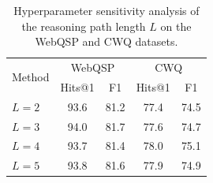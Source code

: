 \begin{table}[t]
\centering
\small
\begin{tabular}{lcccc}
\toprule
\multirow{2}{*}{Method} & \multicolumn{2}{c}{WebQSP} & \multicolumn{2}{c}{CWQ} \\
 & Hits@1 & F1 & Hits@1 & F1 \\
\midrule
$L=2$ & 93.6 & 81.2 & 77.4 & 74.5 \\
$L=3$ & 94.0 & 81.7 & 77.6 & 74.7 \\
$L=4$ & 93.7 & 81.4 & 78.0 & 75.1 \\
$L=5$ & 93.8 & 81.6 & 77.9 & 74.9 \\
\bottomrule
\end{tabular}
\caption{Hyperparameter sensitivity analysis of the reasoning path length $L$ on the WebQSP and CWQ datasets.}
\label{tab:sensitive_length}
\end{table}



